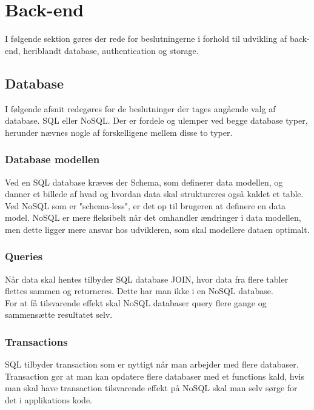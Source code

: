 \section{Back-end}
I følgende sektion gøres der rede for beslutningerne i forhold til udvikling af back-end, heriblandt database, authentication og storage.

\subsection{Database}
I følgende afsnit redegøres for de beslutninger der tages angående valg af database. SQL eller NoSQL.
Der er fordele og ulemper ved begge database typer, herunder nævnes nogle af forskelligene mellem disse to typer.

\subsubsection{Database modellen}
Ved en SQL database kræves der Schema, som definerer data modellen, og danner et billede af hvad og hvordan data skal struktureres også kaldet et table. Ved NoSQL som er "schema-less", er det op til brugeren at definere en data model. NoSQL er mere fleksibelt når det omhandler ændringer i data modellen, men dette ligger mere ansvar hos udvikleren, som skal modellere dataen optimalt. \\

\subsubsection{Queries\cite{Query}}
Når data skal hentes tilbyder SQL database JOIN\cite{JOIN}, hvor data fra flere tabler flettes sammen og returneres. Dette har man ikke i en NoSQL database. \\
For at få tilsvarende effekt skal NoSQL databaser query flere gange og sammensætte resultatet selv.

\subsubsection{Transactions\cite{Transactions}}
 SQL tilbyder transaction som er nyttigt når man arbejder med flere databaser. Transaction gør at man kan opdatere flere databaser med et functions kald, hvis man skal have transaction tilsvarende effekt på NoSQL skal man selv sørge for det i applikations kode. 

 
